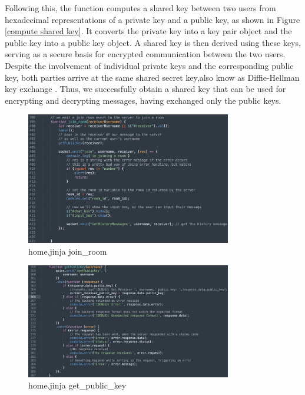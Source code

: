 \documentclass[12pt]{article}
\begin{document}
\begin{enumerate}
            Following this, the function computes a shared key between two users from hexadecimal representations of a private key and a public key, as shown in Figure \ref{compute shared key}. It converts the private key into a key pair object and the public key into a public key object\cite{elliptic_js}. A shared key is then derived using these keys, serving as a secure basis for encrypted communication between the two users. Despite the involvement of individual private keys and the corresponding public key, both parties arrive at the same shared secret key,also know as Diffie-Hellman key exchange \cite{gillis_diffie_hellman_2024}. Thus, we successfully obtain a shared key that can be used for encrypting and decrypting messages, having exchanged only the public keys.


            \begin{figure}[H]
                \centering{}
                \includegraphics[width=0.8\textwidth]{graphs/front_join_room.jpg}
                \caption{home.jinja join\_room}
                \label{front join room}
            \end{figure}

            \begin{figure}[H]
                \centering
                \includegraphics[width=0.8\textwidth]{graphs/front_get_public_key}
                \caption{home.jinja get\_public\_key}
                \label{get public key}
            \end{figure}



\end{enumerate}
\end{document}
